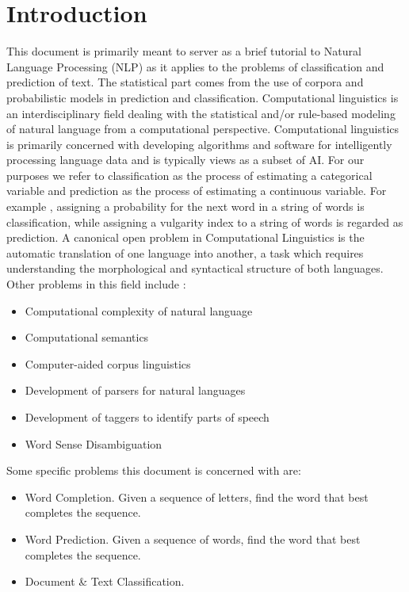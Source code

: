 \section{Introduction}
This document is primarily meant to server as a brief tutorial to Natural Language Processing (NLP) as it applies to the problems of classification and prediction of text.  The statistical part comes from the use of corpora and probabilistic models in prediction and classification.  Computational linguistics is an interdisciplinary field dealing with the statistical and/or rule-based modeling of natural language from a computational perspective.  Computational linguistics is primarily concerned with developing algorithms and software for intelligently processing language data and is typically views as a subset of AI.  For our purposes we refer to classification as the process of estimating a categorical variable and prediction as the process of estimating a continuous variable.  For example , assigning a probability for the next word in a string of words is classification, while assigning a vulgarity index to a string of words is regarded as prediction.  A canonical open problem in Computational Linguistics is the automatic translation of one language into another, a task which requires understanding the morphological and syntactical structure of both languages. Other problems in this field include :
\begin{center}
\begin{itemize}
  \item Computational complexity of natural language
  \item Computational semantics
  \item Computer-aided corpus linguistics
  \item Development of parsers for natural languages
  \item Development of taggers to identify parts of speech
  \item Word Sense Disambiguation
\end{itemize}
\end{center}
Some specific problems this document is concerned with are:
\begin{itemize}
  \item Word Completion.  Given a sequence of letters, find the word that best completes the sequence.
  \item Word Prediction. Given a sequence of words, find the word that best completes the sequence.
  \item Document \& Text Classification.
\end{itemize}

